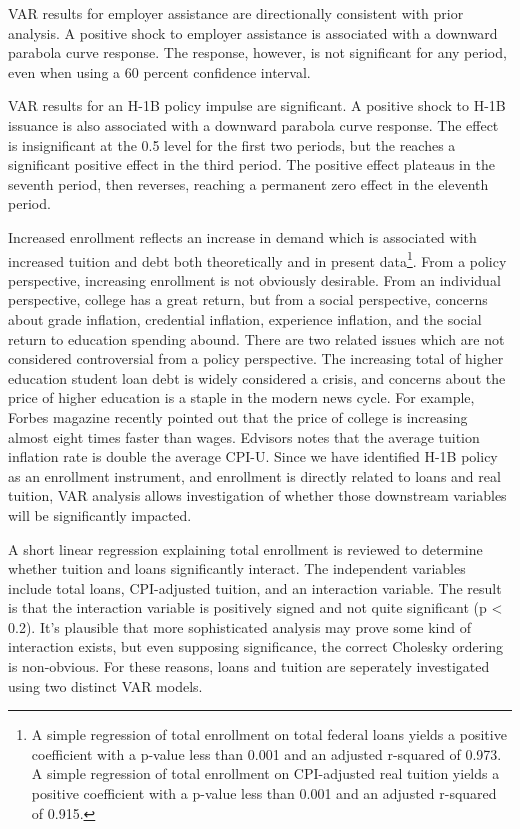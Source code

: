 \documentclass[review]{elsarticle}
\begin{document}
VAR results for employer assistance are directionally consistent with prior analysis.
A positive shock to employer assistance is associated with a downward parabola curve response.
The response, however, is not significant for any period, even when using a 60 percent confidence interval.

VAR results for an H-1B policy impulse are significant.
A positive shock to H-1B issuance is also associated with a downward parabola curve response.
The effect is insignificant at the 0.5 level for the first two periods,
but the reaches a significant positive effect in the third period.
The positive effect plateaus in the seventh period, then reverses,
reaching a permanent zero effect in the eleventh period.

Increased enrollment reflects an increase in demand which is associated with
increased tuition and debt both theoretically and in present data\footnote{
    A simple regression of total enrollment on total federal loans yields a
    positive coefficient with a p-value less than 0.001 and an adjusted r-squared
    of 0.973.
    A simple regression of total enrollment on CPI-adjusted real tuition yields a
    positive coefficient with a p-value less than 0.001 and an adjusted r-squared
    of 0.915.
}.
From a policy perspective, increasing enrollment is not obviously desirable.
From an individual perspective, college has a great return,
but from a social perspective,
concerns about grade inflation,
credential inflation,
experience inflation,
and the social return to education spending abound.
There are two related issues which are not considered controversial from a policy perspective.
The increasing total of higher education student loan debt is widely considered a crisis,
and concerns about the price of higher education is a staple in the modern news cycle.
For example, Forbes magazine recently pointed out that the price of college is increasing almost eight times faster than wages\cite{maldonado2018price}.
Edvisors notes that the average tuition inflation rate is double the average CPI-U\cite{edvisors_2019}.
Since we have identified H-1B policy as an enrollment instrument,
and enrollment is directly related to loans and real tuition,
VAR analysis allows investigation of whether those downstream variables will be significantly impacted.

A short linear regression explaining total enrollment
is reviewed to determine whether tuition and loans significantly interact.
The independent variables include total loans,
CPI-adjusted tuition,
and an interaction variable.
The result is that the interaction variable is positively signed and not quite significant (p < 0.2).
It's plausible that more sophisticated analysis may prove some kind of interaction exists,
but even supposing significance, the correct Cholesky ordering is non-obvious.
For these reasons, loans and tuition are seperately investigated using two distinct VAR models.
\end{document}
